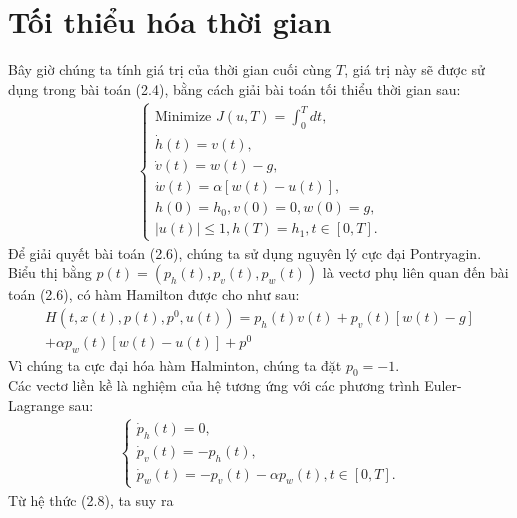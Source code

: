 \documentclass[12pt,a4paper]{report}
\begin{document}
	\section{Tối thiểu hóa thời gian}
	Bây giờ chúng ta tính giá trị của thời gian cuối cùng $T$, giá trị này sẽ được sử dụng trong bài toán (2.4), bằng cách giải bài toán tối thiểu thời gian sau:
	\begin{eqnarray}
		\begin{cases}
			\text{Minimize } J(u, T) = \int_{0}^{T}dt, \\ \dot{h}(t) = v(t), \\ \dot{v}(t) = w(t) - g, \\ \dot{w}(t) = \alpha[w(t) - u(t)], \\h(0) = h_0, v(0) = 0, w(0) = g, \\ |u(t)| \leq 1, h(T) = h_1, t\in [0, T].
		\end{cases}
	\end{eqnarray}
	Để giải quyết bài toán (2.6), chúng ta sử dụng nguyên lý cực đại Pontryagin. Biểu thị bằng $p(t) = (p_h(t), p_v(t), p_w(t))$ là vectơ phụ liên quan đến bài toán (2.6), có hàm Hamilton được cho như sau: \begin{eqnarray}
		H(t, x(t), p(t), p^0, u(t)) = p_h(t)v(t) + p_v(t)[w(t) - g] \nonumber\\ + \alpha p_w(t)[w(t) - u(t)] + p^0
	\end{eqnarray}
	Vì chúng ta cực đại hóa hàm Halminton, chúng ta đặt $p_0 = -1$.\\ Các vectơ liền kề là nghiệm của hệ tương ứng với các phương trình Euler-Lagrange sau:
	\begin{eqnarray}
		\begin{cases}
			\dot{p}_h(t) = 0, \\ \dot{p}_v(t) = -p_h(t), \\ \dot{p}_w(t) = -p_v(t) - \alpha p_w(t), t \in [0, T].
		\end{cases}
	\end{eqnarray}
	Từ hệ thức (2.8), ta suy ra
\end{document}
